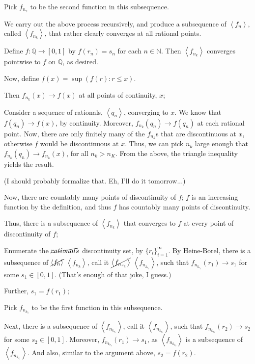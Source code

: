 \documentclass[a4paper,12pt]{article}
\newcommand{\tab}{\hspace{4mm}} %
\newcommand{\anbrack}[1]{\left\langle #1 \right\rangle}
\newcommand{\N}{\mathbb{N}}
\newcommand{\Q}{\mathbb{Q}}
\begin{document}
\tab Pick $f_{n_2}$ to be the second function in this subsequence.

\tab We carry out the above process recursively, and produce a subsequence of $\anbrack{f_n}$, called $\anbrack{f_{n_k}}$, that rather clearly converges at all rational points. 

\tab Define $f: \Q \to [0,1]$ by $f(r_n) = s_n$ for each $n \in \N$. Then $\anbrack{f_{n_k}}$ converges pointwise to $f$ on $\Q$, as desired.

Now, define $f(x) = \sup(f(r): r \leq x)$.

Then $f_{n_k}(x) \to f(x)$ at all points of continuity, $x$;

\tab Consider a sequence of rationals, $\anbrack{q_n}$, converging to $x$. We know that $f(q_n) \to f(x)$, by continuity. Moreover, $f_{n_k}(q_n) \to f(q_n)$ at each rational point. Now, there are only finitely many of the $f_{n_k}$s that are discontinuous at $x$, otherwise $f$ would be discontinuous at $x$. Thus, we can pick $n_k$ large enough that $f_{n_k}(q_n) \to f_{n_k}(x)$, for all $n_k > n_K$. From the above, the triangle inequality yields the result.

\tab (I should probably formalize that. Eh, I'll do it tomorrow...)

Now, there are countably many points of discontinuity of $f$; $f$ is an increasing function by the definition, and thus $f$ has countably many points of discontinuity.

Thus, there is a subsequence of $\anbrack{f_{n_k}}$ that converges to $f$ at every point of discontinuity of $f$;

\tab Enumerate the $\cancel{rationals}$ discontinuity set, by $\{r_i\}_{i=1}^\infty$. By Heine-Borel, there is a subsequence of $\cancel{\anbrack{f_n}}$ $\anbrack{f_{n_k}}$, call it $\cancel{\anbrack{f_{n_{r_1}}}}$ $\anbrack{f_{n_{k_{r_1}}}}$, such that $f_{n_{k_{r_1}}}(r_1) \to s_1$ for some $s_1 \in [0,1]$. (That's enough of that joke, I guess.)

\tab Further, $s_1 = f(r_1)$; %

\tab Pick $f_{n_{k_1}}$ to be the first function in this subsequence.

\tab Next, there is a subsequence of $\anbrack{f_{n_{k_{r_1}}}}$, call it $\anbrack{f_{n_{k_{r_2}}}}$, such that $f_{n_{k_{r_2}}}(r_2) \to s_2$ for some $s_2 \in [0,1]$. Moreover, $f_{n_{k_{r_2}}}(r_1) \to s_1$, as $\anbrack{f_{n_{k_{r_2}}}}$ is a subsequence of $\anbrack{f_{n_{k_{r_1}}}}$. And also, similar to the argument above, $s_2 = f(r_2)$.
\end{document}
